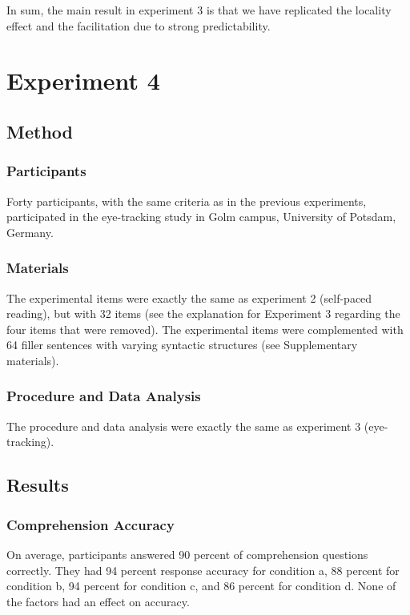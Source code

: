 \documentclass{frontiersSCNS}\usepackage{knitr} %
\begin{document}
In sum, the main result in experiment 3 is that we have replicated the locality effect and the facilitation due to strong predictability. 

\section{Experiment 4}
\subsection{Method}
\subsubsection{Participants}

Forty participants, with the same criteria as in the previous experiments, participated in the eye-tracking study in Golm campus, University of Potsdam, Germany.

\subsubsection{Materials}

The experimental items were exactly the same as experiment 2 (self-paced reading), but with 32 items (see the explanation for Experiment 3 regarding the four items that were removed). The experimental items were complemented with 64 filler sentences with varying syntactic structures (see Supplementary materials).

\subsubsection{Procedure and Data Analysis}

The procedure and data analysis were exactly the same as experiment 3 (eye-tracking).



\subsection{Results}
\subsubsection{Comprehension Accuracy}



On average, participants answered 90 percent of  comprehension questions correctly. They had 
94
percent response accuracy for condition a, 
88
percent for condition b, 
94
percent for condition c, and 
86
percent for condition d. None of the factors had 
an effect on accuracy.
\end{document}
